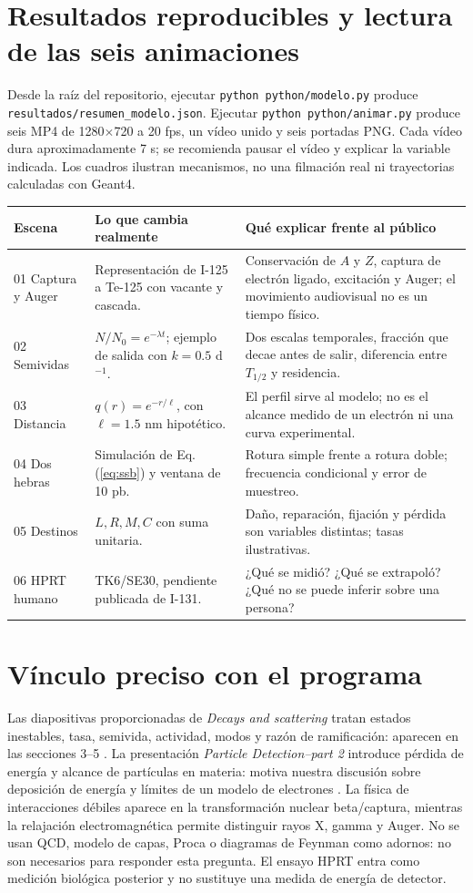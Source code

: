 \documentclass[11pt,a4paper]{article}
\begin{document}
\section{Resultados reproducibles y lectura de las seis animaciones}
Desde la raíz del repositorio, ejecutar \texttt{python python/modelo.py} produce \texttt{resultados/resumen\_modelo.json}. Ejecutar \texttt{python python/animar.py} produce seis MP4 de 1280$\times$720 a 20 fps, un vídeo unido y seis portadas PNG. Cada vídeo dura aproximadamente 7 s; se recomienda pausar el vídeo y explicar la variable indicada. Los cuadros ilustran mecanismos, no una filmación real ni trayectorias calculadas con Geant4.

\begin{longtable}{p{}p{}p{}}\toprule Escena & Lo que cambia realmente & Qué explicar frente al público \\ \midrule\endhead
01 Captura y Auger & Representación de I-125 a Te-125 con vacante y cascada. & Conservación de $A$ y $Z$, captura de electrón ligado, excitación y Auger; el movimiento audiovisual no es un tiempo físico. \\
02 Semividas & $N/N_0=e^{-\lambda t}$; ejemplo de salida con $k=0.5$ d$^{-1}$. & Dos escalas temporales, fracción que decae antes de salir, diferencia entre $T_{1/2}$ y residencia. \\
03 Distancia & $q(r)=e^{-r/\ell}$, con $\ell=1.5$ nm hipotético. & El perfil sirve al modelo; no es el alcance medido de un electrón ni una curva experimental. \\
04 Dos hebras & Simulación de Eq. (\ref{eq:ssb}) y ventana de 10 pb. & Rotura simple frente a rotura doble; frecuencia condicional y error de muestreo. \\
05 Destinos & $L,R,M,C$ con suma unitaria. & Daño, reparación, fijación y pérdida son variables distintas; tasas ilustrativas. \\
06 HPRT humano & TK6/SE30, pendiente publicada de I-131. & ¿Qué se midió? ¿Qué se extrapoló? ¿Qué no se puede inferir sobre una persona? \\
\bottomrule\end{longtable}

\section{Vínculo preciso con el programa}
Las diapositivas proporcionadas de \emph{Decays and scattering} tratan estados inestables, tasa, semivida, actividad, modos y razón de ramificación: aparecen en las secciones 3--5 \cite{curso}. La presentación \emph{Particle Detection--part 2} introduce pérdida de energía y alcance de partículas en materia: motiva nuestra discusión sobre deposición de energía y límites de un modelo de electrones \cite{deteccion}. La física de interacciones débiles aparece en la transformación nuclear beta/captura, mientras la relajación electromagnética permite distinguir rayos X, gamma y Auger. No se usan QCD, modelo de capas, Proca o diagramas de Feynman como adornos: no son necesarios para responder esta pregunta. El ensayo HPRT entra como medición biológica posterior y no sustituye una medida de energía de detector.
\end{document}

